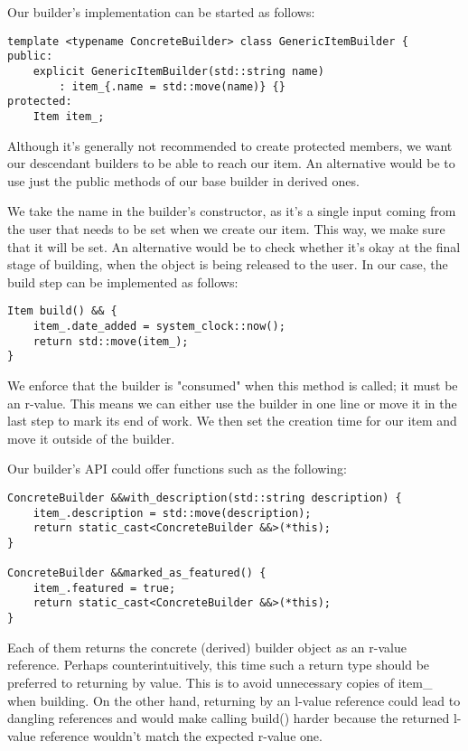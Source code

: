 Our builder's implementation can be started as follows:

\begin{lstlisting}[style=styleCXX]
template <typename ConcreteBuilder> class GenericItemBuilder {
public:
	explicit GenericItemBuilder(std::string name)
		: item_{.name = std::move(name)} {}
protected:
	Item item_;
\end{lstlisting}

Although it's generally not recommended to create protected members, we want our descendant builders to be able to reach our item. An alternative would be to use just the public methods of our base builder in derived ones.

We take the name in the builder's constructor, as it's a single input coming from the user that needs to be set when we create our item. This way, we make sure that it will be set. An alternative would be to check whether it's okay at the final stage of building, when the object is being released to the user. In our case, the build step can be implemented as follows:

\begin{lstlisting}[style=styleCXX]
Item build() && {
	item_.date_added = system_clock::now();
	return std::move(item_);
}
\end{lstlisting}

We enforce that the builder is "consumed" when this method is called; it must be an r-value. This means we can either use the builder in one line or move it in the last step to mark its end of work. We then set the creation time for our item and move it outside of the builder.

Our builder's API could offer functions such as the following:

\begin{lstlisting}[style=styleCXX]
ConcreteBuilder &&with_description(std::string description) {
	item_.description = std::move(description);
	return static_cast<ConcreteBuilder &&>(*this);
}

ConcreteBuilder &&marked_as_featured() {
	item_.featured = true;
	return static_cast<ConcreteBuilder &&>(*this);
}
\end{lstlisting}

Each of them returns the concrete (derived) builder object as an r-value reference. Perhaps counterintuitively, this time such a return type should be preferred to returning by value. This is to avoid unnecessary copies of item\_ when building. On the other hand, returning by an l-value reference could lead to dangling references and would make calling build() harder because the returned l-value reference wouldn't match the expected r-value one.

